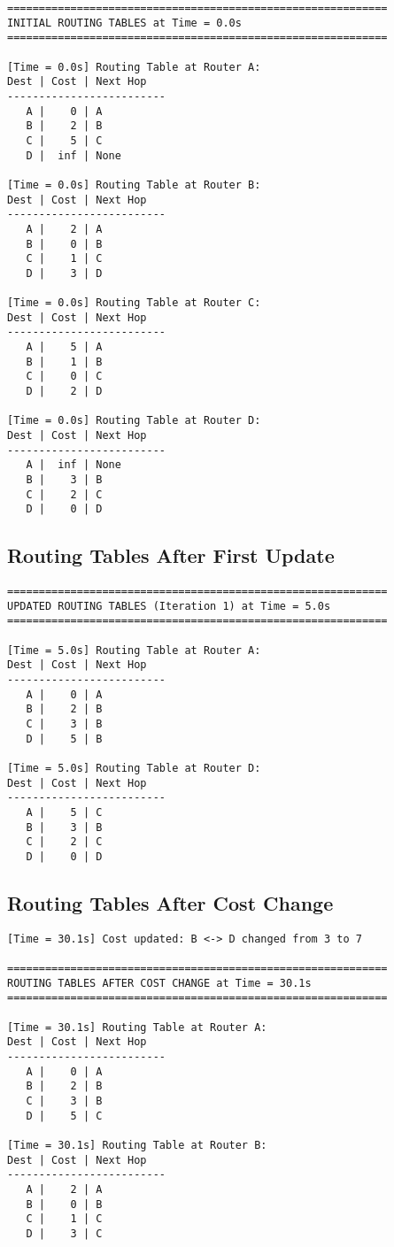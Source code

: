 \documentclass[12pt,a4paper]{article}
\begin{document}
\begin{verbatim}
============================================================
INITIAL ROUTING TABLES at Time = 0.0s
============================================================

[Time = 0.0s] Routing Table at Router A:
Dest | Cost | Next Hop
-------------------------
   A |    0 | A
   B |    2 | B
   C |    5 | C
   D |  inf | None

[Time = 0.0s] Routing Table at Router B:
Dest | Cost | Next Hop
-------------------------
   A |    2 | A
   B |    0 | B
   C |    1 | C
   D |    3 | D

[Time = 0.0s] Routing Table at Router C:
Dest | Cost | Next Hop
-------------------------
   A |    5 | A
   B |    1 | B
   C |    0 | C
   D |    2 | D

[Time = 0.0s] Routing Table at Router D:
Dest | Cost | Next Hop
-------------------------
   A |  inf | None
   B |    3 | B
   C |    2 | C
   D |    0 | D
\end{verbatim}

\subsection{Routing Tables After First Update}

\begin{verbatim}
============================================================
UPDATED ROUTING TABLES (Iteration 1) at Time = 5.0s
============================================================

[Time = 5.0s] Routing Table at Router A:
Dest | Cost | Next Hop
-------------------------
   A |    0 | A
   B |    2 | B
   C |    3 | B
   D |    5 | B

[Time = 5.0s] Routing Table at Router D:
Dest | Cost | Next Hop
-------------------------
   A |    5 | C
   B |    3 | B
   C |    2 | C
   D |    0 | D
\end{verbatim}

\subsection{Routing Tables After Cost Change}

\begin{verbatim}
[Time = 30.1s] Cost updated: B <-> D changed from 3 to 7

============================================================
ROUTING TABLES AFTER COST CHANGE at Time = 30.1s
============================================================

[Time = 30.1s] Routing Table at Router A:
Dest | Cost | Next Hop
-------------------------
   A |    0 | A
   B |    2 | B
   C |    3 | B
   D |    5 | C

[Time = 30.1s] Routing Table at Router B:
Dest | Cost | Next Hop
-------------------------
   A |    2 | A
   B |    0 | B
   C |    1 | C
   D |    3 | C
\end{verbatim}
\end{document}
